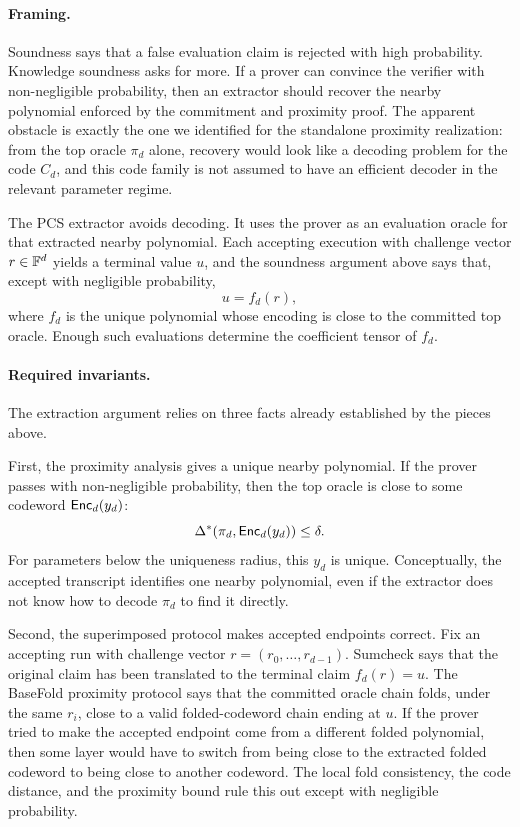 \paragraph{Framing.}
Soundness says that a false evaluation claim is rejected with high probability.
Knowledge soundness asks for more.  If a prover can convince the verifier with
non-negligible probability, then an extractor should recover the nearby
polynomial enforced by the commitment and proximity proof.  The apparent
obstacle is exactly the one we identified for the standalone proximity
realization: from the top oracle $\pi_d$ alone,
recovery would look like a decoding problem for the code $C_d$, and this code
family is not assumed to have an efficient decoder in the relevant parameter
regime.

The PCS extractor avoids decoding.  It uses the prover as an evaluation oracle
for that extracted nearby polynomial.  Each accepting execution with challenge vector
$r\in\mathbb{F}^d$ yields a terminal value $u$, and the soundness argument above says
that, except with negligible probability,
\[
  u=f_d(r),
\]
where $f_d$ is the unique polynomial whose encoding is close to the committed
top oracle.  Enough such evaluations determine the coefficient tensor of $f_d$.

\paragraph{Required invariants.}
The extraction argument relies on three facts already established by the pieces
above.

First, the proximity analysis gives a unique nearby polynomial.  If the
prover passes with non-negligible probability, then the top oracle is close to
some codeword $\mathsf{Enc}_d(y_d)$:
\[
  \Delta^*(\pi_d,\mathsf{Enc}_d(y_d))\le\delta.
\]
For parameters below the uniqueness radius, this $y_d$ is unique.  Conceptually,
the accepted transcript identifies one nearby polynomial, even if the extractor
does not know how to decode $\pi_d$ to find it directly.

Second, the superimposed protocol makes accepted endpoints correct.  Fix an
accepting run with challenge vector $r=(r_0,\ldots,r_{d-1})$.  Sumcheck says that
the original claim has been translated to the terminal claim $f_d(r)=u$.  The
BaseFold proximity protocol says that the committed oracle chain folds, under
the same $r_i$, close to a valid folded-codeword chain ending at $u$.  If the
prover tried to make the accepted endpoint come from a different folded
polynomial, then some layer would have to switch from being close to the
extracted folded codeword to being close to another codeword.  The local fold
consistency, the code distance, and the proximity bound rule this out except
with negligible probability.

